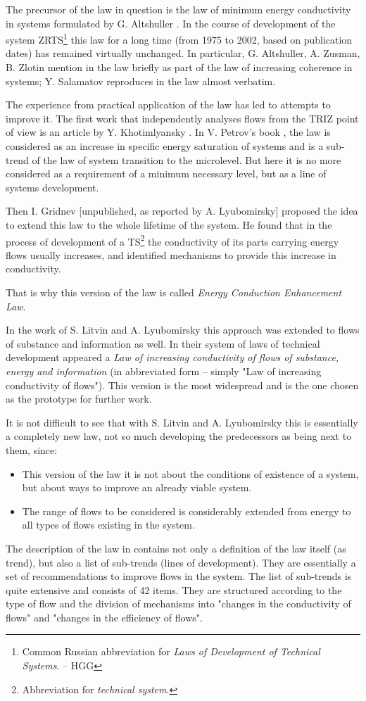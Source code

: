 \documentclass[a4paper,11pt]{article}
\begin{document}
The precursor of the law in question is the law of minimum energy conductivity
in systems formulated by G. Altshuller \cite{B1}. In the course of development
of the system ZRTS\footnote{Common Russian abbreviation for \emph{Laws of
    Development of Technical Systems}. -- HGG} this law for a long time (from
1975 to 2002, based on publication dates) has remained virtually unchanged. In
particular, G. Altshuller, A. Zusman, B. Zlotin mention in \cite[p. 1, 56]{B2}
the law briefly as part of the law of increasing coherence in systems;
Y. Salamatov reproduces in \cite{B3} the law almost verbatim.

The experience from practical application of the law has led to attempts to
improve it. The first work that independently analyses flows from the TRIZ
point of view is an article by Y. Khotimlyansky \cite{B4}. In V. Petrov's book
\cite{B5}, the law is considered as an increase in specific energy saturation
of systems and is a sub-trend of the law of system transition to the
microlevel.  But here it is no more considered as a requirement of a minimum
necessary level, but as a line of systems development.

Then I. Gridnev [unpublished, as reported by A. Lyubomirsky] proposed the idea
to extend this law to the whole lifetime of the system. He found that in the
process of development of a TS\footnote{Abbreviation for \emph{technical
    system}.} the conductivity of its parts carrying energy flows usually
increases, and identified mechanisms to provide this increase in conductivity.

That is why this version of the law is called \emph{Energy Conduction
  Enhancement Law}.

In the work of S. Litvin and A. Lyubomirsky \cite{B6} this approach was
extended to flows of substance and information as well.  In their system of
laws of technical development appeared a \emph{Law of increasing conductivity
  of flows of substance, energy and information} (in abbreviated form --
simply "Law of increasing conductivity of flows"). This version is the most
widespread and is the one chosen as the prototype for further work.

It is not difficult to see that with S. Litvin and A. Lyubomirsky this is
essentially a completely new law, not so much developing the predecessors as
being next to them, since:
\begin{itemize}
\item This version of the law it is not about the conditions of existence of a
  system, but about ways to improve an already viable system.
\item The range of flows to be considered is considerably extended from energy
  to all types of flows existing in the system.
\end{itemize}
The description of the law in \cite{B6} contains not only a definition of the
law itself (as trend), but also a list of sub-trends (lines of development).
They are essentially a set of recommendations to improve flows in the system.
The list of sub-trends is quite extensive and consists of 42 items. They are
structured according to the type of flow and the division of mechanisms into
"changes in the conductivity of flows" and "changes in the efficiency of
flows".
\end{document}

